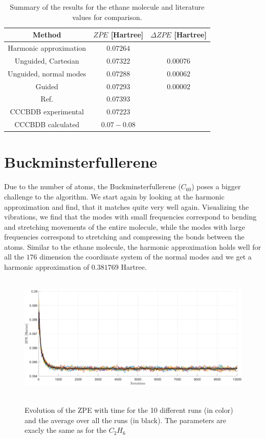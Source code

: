 \documentclass [12pt]{report}
\begin{document}
\begin{table}[h]
\centering
 \begin{tabular}{||c | c | c||} 
 \hline
 Method & $\overline{ZPE}$ [Hartree] & $\Delta ZPE$ [Hartree] \\ [0.5ex] 
 \hline\hline
 Harmonic approximation & $0.07264$ & \\
 Unguided, Cartesian & $0.07322$ &  $0.00076$\\
  \hline
 Unguided, normal modes & $0.07288$ &  $0.00062$\\
 \hline
 Guided & $0.07293$ & $0.00002$ \\
 \hline
 Ref. \cite{c2h6} & $0.07393$ &\\
 \hline
 CCCBDB experimental \cite{cccbdb} & $0.07223$ & \\
 \hline
 CCCBDB calculated \cite{cccbdb} & $0.07 - 0.08$ & \\
 \hline
\end{tabular}
\caption{Summary of the results for the ethane molecule and literature values for comparison.}
\end{table}


\section{Buckminsterfullerene}
Due to the number of atoms, the Buckminsterfullerene ($C_{60}$) poses a bigger challenge to the algorithm. We start again by looking at the harmonic approximation and find, that it matches quite very well again. Visualizing the vibrations, we find that the modes with small frequencies correspond to bending and stretching movements of the entire molecule, while the modes with large frequencies correspond to stretching and compressing the bonds between the atoms. 
Similar to the ethane molecule, the harmonic approximation holds well for all the $176$ dimension the coordinate system of the normal modes and we get a harmonic approximation of $0.381769$ Hartree.

\begin{figure}[h]
\includegraphics[width=\linewidth, height=6cm] {c60_1.png} \label{c60_1}
\caption{Evolution of the ZPE with time for the 10 different runs (in color) and the average over all the runs (in black). The parameters are exacly the same as for the $C_2H_6$} \label{cap_c60_1}
\end{figure}
\end{document}
